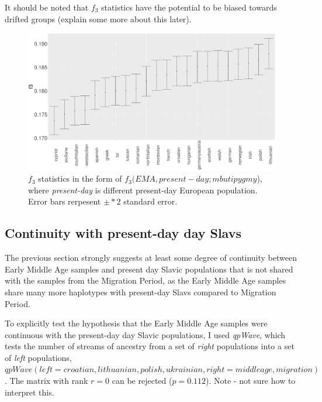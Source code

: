 It should be noted that $f_{3}$ statistics have the potential to be biased towards drifted groups (explain some more about this later).

\begin{figure}[htp]
    \centering
    \includegraphics[width=1.0\textwidth]{../images/chapter5/f3_HB_ancient_slavs.pdf}
    \caption{$f_{3}$ statistics in the form of $f_{3}(EMA, present-day;mbuti pygmy$), where \textit{present-day} is different present-day European population. Error bars rerpesent $\pm*2$ standard error.}
    \label{fig:f3_HB_ancient_slavs}
\end{figure}

\subsection{Continuity with present-day day Slavs}

The previous section strongly suggests at least some degree of continuity between Early Middle Age samples and present day Slavic populations that is not shared with the samples from the Migration Period, as the Early Middle Age samples share many more haplotypes with present-day Slavs compared to Migration Period. 

To explicitly test the hypothesis that the Early Middle Age samples were continuous with the present-day day Slavic populations, I used \textit{qpWave}, which tests the number of streams of ancestry from a set of \textit{right} populations into a set of \textit{left} populations, $qpWave(left=croatian,lithuanian,polish,ukrainian, right=middleage,migration)$. The matrix with rank $r=0$ can be rejected ($p=0.112$). Note - not sure how to interpret this. 

